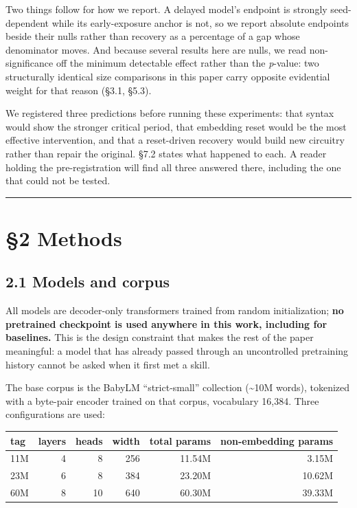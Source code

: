 \documentclass[11pt]{article}
\begin{document}
Two things follow for how we report. A delayed model's endpoint is strongly seed-dependent
while its early-exposure anchor is not, so we report absolute endpoints beside their nulls
rather than recovery as a percentage of a gap whose denominator moves. And because several
results here are nulls, we read non-significance off the minimum detectable effect rather
than the \emph{p}-value: two structurally identical size comparisons in this paper carry
opposite evidential weight for that reason (§3.1, §5.3).

We registered three predictions before running these experiments: that syntax would show the
stronger critical period, that embedding reset would be the most effective intervention, and
that a reset-driven recovery would build new circuitry rather than repair the original. §7.2
states what happened to each. A reader holding the pre-registration will find all three
answered there, including the one that could not be tested.

\begin{center}\rule{0.5\linewidth}{0.5pt}\end{center}

\section{§2 Methods}\label{methods}

\subsection{2.1 Models and corpus}\label{models-and-corpus}

All models are decoder-only transformers trained from random initialization; \textbf{no pretrained
checkpoint is used anywhere in this work, including for baselines.} This is the design
constraint that makes the rest of the paper meaningful: a model that has already passed
through an uncontrolled pretraining history cannot be asked when it first met a skill.

The base corpus is the BabyLM ``strict-small'' collection (\textasciitilde10M words), tokenized with a
byte-pair encoder trained on that corpus, vocabulary 16,384. Three configurations are used:

\begin{table}[t]
\centering\small
\begin{tabular}{@{}lrrrrr@{}}
\toprule\noalign{}
tag & layers & heads & width & total params & non-embedding params \\
\midrule\noalign{}

11M & 4 & 8 & 256 & 11.54M & 3.15M \\
23M & 6 & 8 & 384 & 23.20M & 10.62M \\
60M & 8 & 10 & 640 & 60.30M & 39.33M \\
\bottomrule
\end{tabular}
\end{table}
\end{document}
